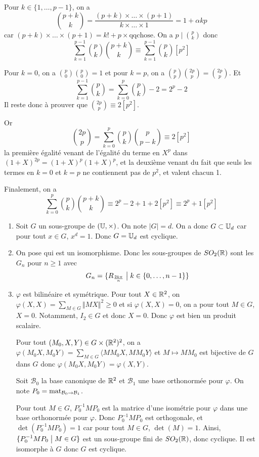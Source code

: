 \begin{solution}
	Pour $k\in\{1,\dots,p-1\}$, on a 
	$$\binom{p+k}{k}=\frac{(p+k)\times\dots\times(p+1)}{k\times\dots\times 1}=1+\alpha kp$$
	car $(p+k)\times\dots\times(p+1)=k!+p\times\text{qqchose}$. On a $p\mid\binom{p}{k}$ donc 
	$$\sum_{k=1}^{p-1}\binom{p}{k}\binom{p+k}{k}\equiv\sum_{k=1}^{p-1}\binom{p}{k}[p^{2}]$$

	Pour $k=0$, on a $\binom{p}{0}\binom{p}{0}=1$ et pour $k=p$, on a $\binom{p}{p}\binom{2p}{p}=\binom{2p}{p}$. Et 
	$$\sum_{k=1}^{p-1}\binom{p}{k}=\sum_{k=0}^{p}\binom{p}{k}-2=2^{p}-2$$
	Il reste donc à prouver que $\binom{2p}{p}\equiv 2[p^{2}]$.

	Or 
	$$\binom{2p}{p}=\sum_{k=0}^{p}\binom{p}{k}\binom{p}{p-k}\equiv2[p^{2}]$$
	la première égalité venant de l'égalité du terme en $X^{p}$ dans $(1+X)^{2p}=(1+X)^{p}(1+X)^{p}$, et la deuxième venant du fait que seuls les termes en $k=0$ et $k=p$ ne contiennent pas de $p^{2}$, et valent chacun 1.

	Finalement, on a 
	$$\sum_{k=0}^{p}\binom{p}{k}\binom{p+k}{k}\equiv 2^{p}-2+1+2[p^{2}]\equiv 2^{p}+1[p^{2}]$$
\end{solution}

\begin{solution}
	\phantom{}
	\begin{enumerate}
		\item Soit $G$ un sous-groupe de $(\mathbb{U},\times)$. On note $\vert G\vert=d$. On a donc $G\subset\mathbb{U}_{d}$ car pour tout $x\in G$, $x^{d}=1$. Donc $G=\mathbb{U}_{d}$ est cyclique.
		
		\item On pose 
		qui est un isomorphisme. Donc les sous-groupes de $SO_{2}(\mathbb{R})$ sont les $G_{n}$ pour $n\geqslant1$ avec 
		$$G_{n}=\{R_{\frac{2k\pi}{n}}\bigm| k\in\{0,\dots,n-1\}\}$$

		\item $\varphi$ est bilinéaire et symétrique. Pour tout $X\in\mathbb{R}^{2}$, on $\varphi(X,X)=\sum_{M\in G}\Vert MX\Vert^{2}\geqslant0$ et si $\varphi(X,X)=0$, on a pour tout $M\in G$, $X=0$. Notamment, $I_{2}\in G$ et donc $X=0$. Donc $\varphi$ est bien un produit scalaire.
		
		Pour tout $(M_{0},X,Y)\in G\times(\mathbb{R}^{2})^{2}$, on a $\varphi(M_{0}X,M_{0}Y)=\sum_{M\in G}\langle MM_{0}X,MM_{0}Y\rangle$
		et $M\mapsto MM_{0}$ est bijective de $G$ dans $G$ donc $\varphi(M_{0}X,M_{0}Y)=\varphi(X,Y)$.

		Soit $\mathcal{B}_{0}$ la base canonique de $\mathbb{R}^{2}$ et $\mathcal{B}_{1}$ une base orthonormée pour $\varphi$. On note $P_{0}=\operatorname{mat}\limits_{\mathcal{B}_{0}\to \mathcal{B}_{1}}$. 
		
		Pour tout $M\in G$, $P_{0}^{-1}MP_{0}$ est la matrice d'une isométrie pour $\varphi$ dans une base orthonormée pour $\varphi$. Donc $P_{0}^{-1}MP_{0}$ est orthogonale, et $\det(P_{0}^{-1}MP_{0})=1$ car pour tout $M\in G$, $\det(M)=1$. Ainsi, $\{P_{0}^{-1}MP_{0}\bigm| M\in G\}$ est un sous-groupe fini de $SO_{2}(\mathbb{R})$, donc cyclique. Il est isomorphe à $G$ donc $G$ est cyclique.
	\end{enumerate}
\end{solution}

